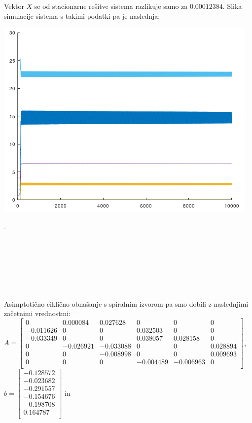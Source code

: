 \documentclass[a4paper, 12pt]{article}
\begin{document}
Vektor $ X $ se od stacionarne rešitve sistema razlikuje samo za $ 0.00012384 $. Slika simulacije
sistema s takimi podatki pa je naslednja:
\begin{center}
	\includegraphics{asimptotic_cyclic_sink.png}
\end{center}
.
\\
\\
\\
\\
\\
\\
\\
\\
Asimptotično ciklično obnašanje s spiralnim izvorom pa smo dobili z naslednjimi
začetnimi vrednostmi:\\
$ A =
\begin{bmatrix}
	0 & 0.000084 & 0.027628 & 0 & 0 & 0 \\
	-0.011626 & 0 & 0 & 0.032503 & 0 & 0 \\
	-0.033349 & 0 & 0 & 0.038057 & 0.028158 & 0 \\
	0 & -0.026921 & -0.033088 & 0 & 0 & 0.028894 \\
	0 & 0 & -0.008998 & 0 & 0 & 0.009693 \\
	0 & 0 & 0 & -0.004489 & -0.006963 & 0 \\
\end{bmatrix} $, \\
$ b =
\begin{bmatrix}
	-0.128572 \\
	-0.023682 \\
	-0.291557 \\
	-0.154676 \\
	-0.198708 \\
	0.164787 \\
\end{bmatrix} $ in
\end{document}
